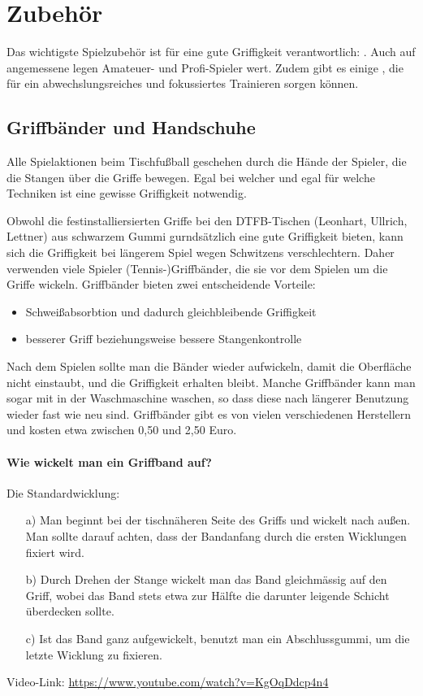 \section{Zubehör}
\label{tisch:zubehoer}

Das wichtigste Spielzubehör ist für eine gute Griffigkeit verantwortlich: .
Auch auf angemessene  legen Amateuer- und Profi-Spieler wert.
Zudem gibt es einige , die für ein abwechslungsreiches und fokussiertes Trainieren sorgen können.

\subsection{Griffbänder und Handschuhe}
\label{tisch:zubehoer:griffe}

Alle Spielaktionen beim Tischfußball geschehen durch die Hände der Spieler, die die Stangen über die Griffe bewegen.
Egal bei welcher  und egal für welche Techniken ist eine gewisse Griffigkeit notwendig. 

Obwohl die festinstalliersierten Griffe bei den DTFB-Tischen (Leonhart, Ullrich, Lettner) aus schwarzem Gummi gurndsätzlich eine gute Griffigkeit bieten, kann sich die Griffigkeit bei längerem Spiel wegen Schwitzens verschlechtern.
Daher verwenden viele Spieler (Tennis-)Griffbänder, die sie vor dem Spielen um die Griffe wickeln. 
Griffbänder bieten zwei entscheidende Vorteile:
\begin{itemize}
\item Schweißabsorbtion und dadurch gleichbleibende Griffigkeit
\item besserer Griff beziehungsweise bessere Stangenkontrolle
\end{itemize}
Nach dem Spielen sollte man die Bänder wieder aufwickeln, damit die Oberfläche nicht einstaubt, und die Griffigkeit erhalten bleibt.
Manche Griffbänder kann man sogar mit in der Waschmaschine waschen, so dass diese nach längerer Benutzung wieder fast  wie neu sind. 
Griffbänder gibt es von vielen verschiedenen Herstellern und kosten etwa zwischen 0,50 und 2,50 Euro. 

\paragraph{Wie wickelt man ein Griffband auf?} Die Standardwicklung: 
\begin{itemize}
\item[a)] Man beginnt bei der tischnäheren Seite des Griffs und wickelt nach außen.
Man sollte darauf achten, dass der Bandanfang durch die ersten Wicklungen fixiert wird. 
\item[b)] Durch Drehen der Stange wickelt man das Band gleichmässig auf den Griff, wobei das Band stets etwa zur Hälfte die darunter leigende Schicht überdecken sollte.
\item[c)] Ist das Band ganz aufgewickelt, benutzt man ein Abschlussgummi, um die letzte Wicklung zu fixieren.
\end{itemize}
Video-Link: \url{https://www.youtube.com/watch?v=KgOqDdcp4n4}


